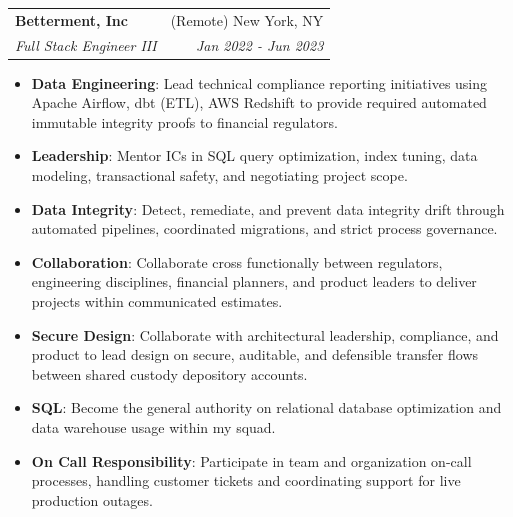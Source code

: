 \documentclass[letterpaper,11pt]{article}
\makeatletter
\newcommand{\resumeItem}[2]{
  \item\small{
    \textbf{#1}{: #2 \vspace{-2pt}}
  }
}
\newcommand{\resumeSubheading}[4]{
  \vspace{-1pt}\item
    \begin{tabular*}{0.97\textwidth}{l@{\extracolsep{\fill}}r}
      \textbf{#1} & #2 \\
      \textit{\small#3} & \textit{\small #4} \\
    \end{tabular*}\vspace{-5pt}
}
\newcommand{\resumeItemListStart}{\begin{itemize}}
\newcommand{\resumeItemListEnd}{\end{itemize}\vspace{-5pt}}
\makeatother
\begin{document}
    \resumeSubheading
      {Betterment, Inc}{(Remote) New York, NY}
      {Full Stack Engineer III}{Jan 2022 - Jun 2023}
      \resumeItemListStart
        \resumeItem{Data Engineering}
          {Lead technical compliance reporting initiatives using Apache Airflow, dbt (ETL), AWS Redshift to provide required automated immutable integrity proofs to financial regulators.}
        \resumeItem{Leadership}
          {Mentor ICs in SQL query optimization, index tuning, data modeling, transactional safety, and negotiating project scope.}
        \resumeItem{Data Integrity}
          {Detect, remediate, and prevent data integrity drift through automated pipelines, coordinated migrations, and strict process governance.}
        \resumeItem{Collaboration}
          {Collaborate cross functionally between regulators, engineering disciplines, financial planners, and product leaders to deliver projects within communicated estimates.}
        \resumeItem{Secure Design}
          {Collaborate with architectural leadership, compliance, and product to lead design on secure, auditable, and defensible transfer flows between shared custody depository accounts.}
        \resumeItem{SQL}
          {Become the general authority on relational database optimization and data warehouse usage within my squad.}
        \resumeItem{On Call Responsibility}
          {Participate in team and organization on-call processes, handling customer tickets and coordinating support for live production outages.}
      \resumeItemListEnd
\end{document}
